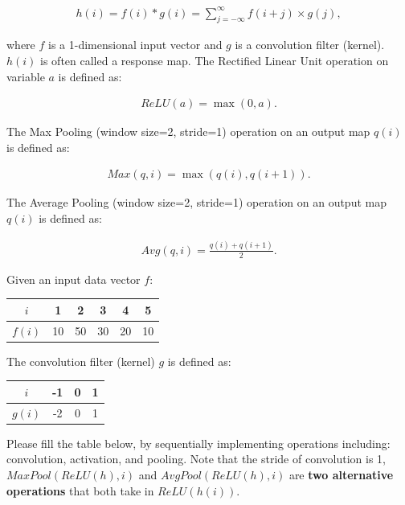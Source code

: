 \documentclass{article}
\begin{document}
\begin{probset}
\begin{prob}
    \begin{align}
        h(i) = f(i) \ast g(i) = \sum_{j=-\infty}^{\infty} f(i + j) \times g(j),
    \end{align}

    where $f$ is a 1-dimensional input vector and $g$ is a convolution filter (kernel). $h(i)$ is often called a response map. The Rectified Linear Unit operation on variable $a$ is defined as:

    \begin{align}
        ReLU(a) = \max(0, a).
    \end{align}

    The Max Pooling (window size=2, stride=1) operation on an output map $q(i)$ is defined as:

    \begin{align}
        Max(q, i) = \max(q(i), q(i + 1)).
    \end{align}

    The Average Pooling (window size=2, stride=1) operation on an output map $q(i)$ is defined as:

    \begin{align}
        Avg(q, i) = \frac{q(i) + q(i + 1)}{2}.
    \end{align}

    Given an input data vector $f$:

    \begin{center}
        \begin{tabular}{|c|c|c|c|c|c|}
            \hline
            $i$ & 1 & 2 & 3 & 4 & 5 \\
            \hline
            $f(i)$ & 10 & 50 & 30 & 20 & 10 \\
            \hline
        \end{tabular}
    \end{center}

    The convolution filter (kernel) $g$ is defined as:

    \begin{center}
        \begin{tabular}{|c|c|c|c|}
            \hline
            $i$ & -1 & 0 & 1 \\
            \hline
            $g(i)$ & -2 & 0 & 1 \\
            \hline
        \end{tabular}
    \end{center}

    Please fill the table below, by sequentially implementing operations including: convolution, activation, and pooling. Note that the stride of convolution is 1, $M axP ool(ReLU(h), i)$ and $AvgP ool(ReLU(h), i)$ are \textbf{two alternative operations} that both take in $ReLU(h(i))$.


\end{prob}
\end{probset}
\end{document}
